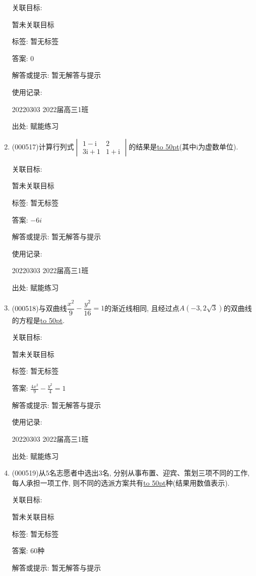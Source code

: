 \documentclass[10pt,a4paper]{article}
\newcommand{\blank}[1]{\underline{\hbox to #1pt{}}}
\begin{document}
\begin{enumerate}[1.]
关联目标:

暂未关联目标



标签: 暂无标签

答案: $0$

解答或提示: 暂无解答与提示

使用记录:

20220303	2022届高三1班	


出处: 赋能练习
\item { (000517)}计算行列式$\begin{vmatrix} 1-\mathrm{i} & 2 \\ 3\mathrm{i}+1 & 1+\mathrm{i}\end{vmatrix}$的结果是\blank{50}(其中$\mathrm{i}$为虚数单位).


关联目标:

暂未关联目标



标签: 暂无标签

答案: $-6i$

解答或提示: 暂无解答与提示

使用记录:

20220303	2022届高三1班	


出处: 赋能练习
\item { (000518)}与双曲线$\dfrac{x^2}9-\dfrac{y^2}{16}=1$的渐近线相同, 且经过点$A(-3,2 \sqrt3)$的双曲线的方程是\blank{50}.


关联目标:

暂未关联目标



标签: 暂无标签

答案: $\frac{4{x^2}}9-\frac{y^2}4=1$

解答或提示: 暂无解答与提示

使用记录:

20220303	2022届高三1班	


出处: 赋能练习
\item { (000519)}从$5$名志愿者中选出$3$名, 分别从事布置、迎宾、策划三项不同的工作, 每人承担一项工作, 则不同的选派方案共有\blank{50}种(结果用数值表示).


关联目标:

暂未关联目标



标签: 暂无标签

答案: $60$种

解答或提示: 暂无解答与提示


\end{enumerate}
\end{document}
